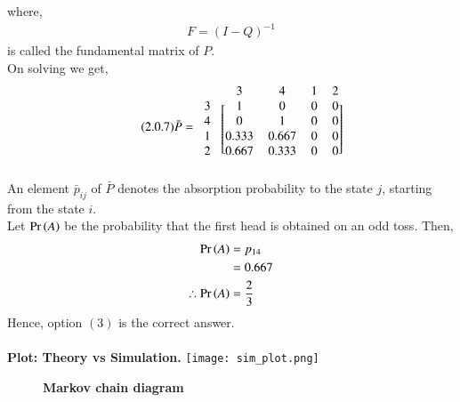 \documentclass[journal,12pt,twocolumn]{IEEEtran}
\begin{document}
where,
\begin{align}
\tag{2.0.6}
\label{eq:2.0.6}
    F=(I-Q)^{-1}
\end{align}
is called the fundamental matrix of $P$. \\
On solving we get,
\begin{align}
    \tag{2.0.7}
    \label{eq:2.0.7}
    \bar P = \begin{blockarray}{ccccc}
    &3 &4 &1 &2\\
    \begin{block}{c[cccc]}
    3 & 1 & 0 & 0 & 0\\
    4 & 0 & 1 & 0 & 0\\
    1 & 0.333 & 0.667 & 0 & 0\\
    2 & 0.667 & 0.333 & 0 & 0\\
    \end{block}
    \end{blockarray}
\end{align}
An element $\bar p_{ij}$ of $\bar P$ denotes the absorption probability to the state $j$, starting from the state $i$.
\\Let $\Pr\left(A\right)$ be the probability that the first head is obtained on an odd toss. Then,
\begin{align}
    \Pr\left(A\right) &= p_{14}\\
    &= 0.667\\
    \therefore \Pr\left(A\right) &= \frac{2}{3}
\end{align}
Hence, option $(3)$ is the correct answer. \\\\
\textbf{Plot: Theory vs Simulation.}
\centering
\texttt{[image: sim\_plot.png]}
\begin{figure}[h]
\caption*{\textbf{Markov chain diagram}}
\centering
{}
\end{figure}
\end{document}
